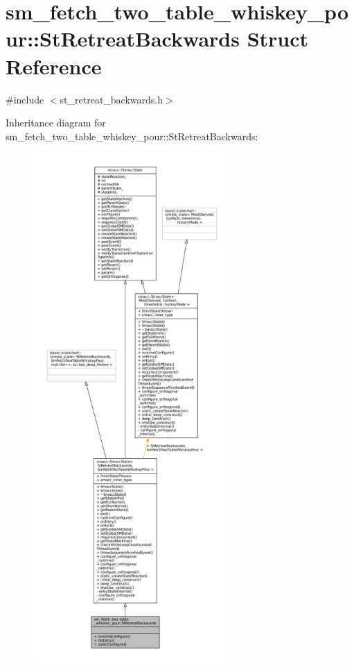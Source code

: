 \hypertarget{structsm__fetch__two__table__whiskey__pour_1_1StRetreatBackwards}{}\section{sm\+\_\+fetch\+\_\+two\+\_\+table\+\_\+whiskey\+\_\+pour\+:\+:St\+Retreat\+Backwards Struct Reference}
\label{structsm__fetch__two__table__whiskey__pour_1_1StRetreatBackwards}


{\ttfamily \#include $<$st\+\_\+retreat\+\_\+backwards.\+h$>$}



Inheritance diagram for sm\+\_\+fetch\+\_\+two\+\_\+table\+\_\+whiskey\+\_\+pour\+:\+:St\+Retreat\+Backwards\+:
\nopagebreak
\begin{figure}[H]
\begin{center}
\leavevmode
\includegraphics[height=550pt]{structsm__fetch__two__table__whiskey__pour_1_1StRetreatBackwards__inherit__graph}
\end{center}
\end{figure}


